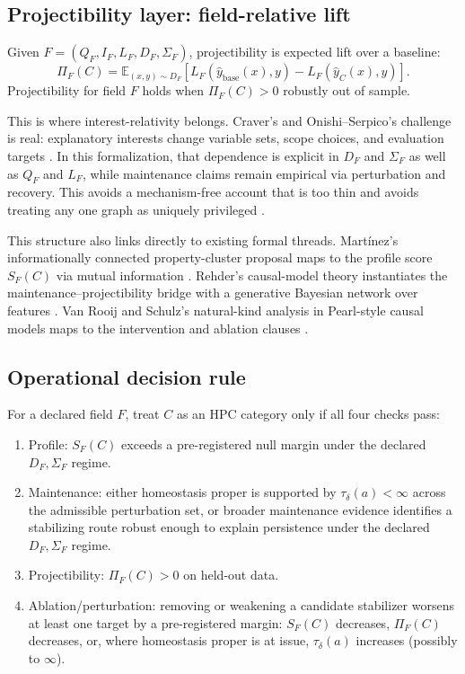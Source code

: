 \subsection*{Projectibility layer: field-relative lift}

Given $F=(Q_F,I_F,L_F,D_F,\Sigma_F)$, projectibility is expected lift over a baseline:
\[
\Pi_F(C)=\mathbb{E}_{(x,y)\sim D_F}\!\left[L_F\!\left(\hat{y}_{\mathrm{base}}(x),y\right)-L_F\!\left(\hat{y}_{C}(x),y\right)\right].
\]
Projectibility for field $F$ holds when $\Pi_F(C)>0$ robustly out of sample.

This is where interest-relativity belongs. Craver's and Onishi--Serpico's challenge is real: explanatory interests change variable sets, scope choices, and evaluation targets \parencite{craver2009,onishi2022}. In this formalization, that dependence is explicit in $D_F$ and $\Sigma_F$ as well as $Q_F$ and $L_F$, while maintenance claims remain empirical via perturbation and recovery. This avoids a mechanism-free account that is too thin and avoids treating any one graph as uniquely privileged \parencite{lemeire2018}.

This structure also links directly to existing formal threads. Martínez's informationally connected property-cluster proposal maps to the profile score $S_F(C)$ via mutual information \parencite{martinez2015informationally}. Rehder's causal-model theory instantiates the maintenance--projectibility bridge with a generative Bayesian network over features \parencite{rehder2003causal}. Van Rooij and Schulz's natural-kind analysis in Pearl-style causal models maps to the intervention and ablation clauses \parencite{vanrooijschulz2019}.

\subsection*{Operational decision rule}

For a declared field $F$, treat $C$ as an HPC category only if all four checks pass:
\begin{enumerate}
    \item Profile: $S_F(C)$ exceeds a pre-registered null margin under the declared $D_F,\Sigma_F$ regime.
    \item Maintenance: either homeostasis proper is supported by $\tau_{\delta}(a)<\infty$ across the admissible perturbation set, or broader maintenance evidence identifies a stabilizing route robust enough to explain persistence under the declared $D_F,\Sigma_F$ regime.
    \item Projectibility: $\Pi_F(C)>0$ on held-out data.
    \item Ablation/perturbation: removing or weakening a candidate stabilizer worsens at least one target by a pre-registered margin: $S_F(C)$ decreases, $\Pi_F(C)$ decreases, or, where homeostasis proper is at issue, $\tau_{\delta}(a)$ increases (possibly to $\infty$).
\end{enumerate}

